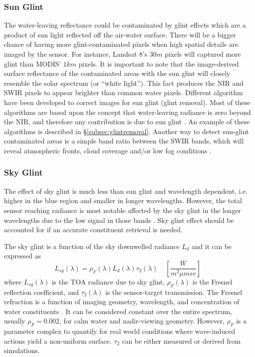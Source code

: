 \subsubsection*{Sun Glint}
The water-leaving reflectance could be contaminated by glint effects which are a product of sun light reflected off the air-water surface. There will be a bigger chance of having more glint-contaminated pixels when high spatial details are imaged by the sensor. For instance, Landsat 8's $30m$ pixels will captured more glint than MODIS' $1km$ pixels. It is important to note that the image-derived surface reflectance of the contaminated areas with the sun glint will closely resemble the solar spectrum (or ``white light''). This fact produces the NIR and SWIR pixels to appear brighter than common water pixels. Different algorithm have been developed to correct images for sun glint (glint removal). Most of these algorithms are based upon the concept that water-leaving radiance is zero beyond the NIR, and therefore any contribution is due to sun glint \cite{Pahlevan:2012}. An example of these algorithms is described in \S\ref{subsec:glintremoval}. Another way to detect sun-glint contaminated areas is a simple band ratio between the SWIR bands, which will reveal atmospheric fronts, cloud coverage and/or low fog conditions \cite{Pahlevan:2012}.
\subsubsection*{Sky Glint}
The effect of sky glint is much less than sun glint and wavelength dependent, i.e. higher in the blue region and smaller in longer wavelengths. However, the total sensor reaching radiance is most notable affected by the sky glint in the longer wavelengths due to the low signal in those bands \cite{Pahlevan:2012}. Sky glint effect should be accounted for if an accurate constituent retrieval is needed.

The sky glint is a function of the sky downwelled radiance $L_d$ and it can be expressed as
\begin{equation}
  L_{sg}(\lambda) = \rho_F(\lambda)L_d(\lambda)\tau_2(\lambda)~~~~~\left[\frac{W}{m^2\mu msr}\right]
\end{equation}
where $L_{sg}(\lambda)$ is the TOA radiance due to sky glint, $\rho_F(\lambda)$ is the Fresnel reflection coefficient, and $\tau_2(\lambda)$ is the sensor-target transmission. The Fresnel refraction is a function of imaging geometry, wavelength, and concentration of water constituents \cite{Pahlevan:2012}. It can be considered constant over the entire spectrum, usually $\rho_F=0.002$, for calm water and nadir-viewing geometry. However, $\rho_F$ is a parameter complex to quantify for real world conditions where wave-induced actions yield a non-uniform surface. $\tau_2$ can be either measured or derived from simulations.
